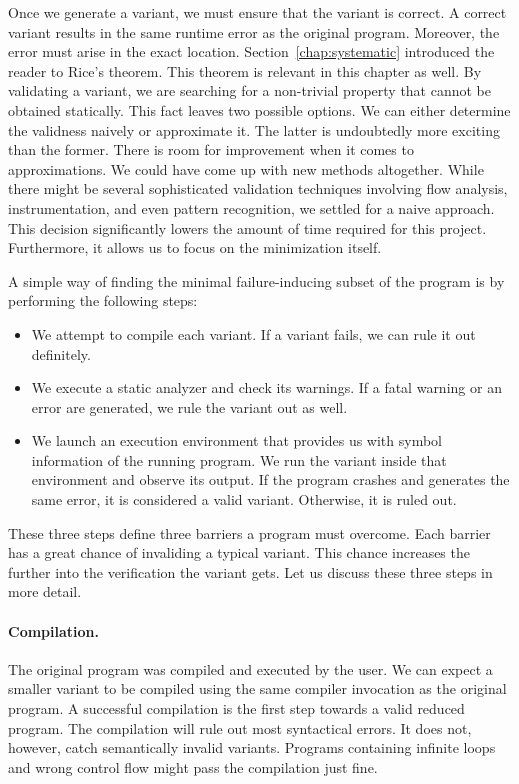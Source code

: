 Once we generate a variant, we must ensure that the variant is correct. 
A correct variant results in the same runtime error as the original program. 
Moreover, the error must arise in the exact location. 
Section~\ref{chap:systematic} introduced the reader to Rice's theorem. 
This theorem is relevant in this chapter as well. 
By validating a variant, we are searching for a non-trivial property that 
cannot be obtained statically. 
This fact leaves two possible options. 
We can either determine the validness naively or approximate it. 
The latter is undoubtedly more exciting than the former. 
There is room for improvement when it comes to approximations. 
We could have come up with new methods altogether. 
While there might be several sophisticated validation techniques involving 
flow analysis, instrumentation, and even pattern recognition, we settled for 
a naive approach. 
This decision significantly lowers the amount of time required for this 
project. 
Furthermore, it allows us to focus on the minimization itself.

A simple way of finding the minimal failure-inducing subset of the program is 
by performing the following steps:
\begin{itemize}
  \item We attempt to compile each variant. 
  If a variant fails, we can rule it out definitely.
  \item We execute a static analyzer and check its warnings. 
  If a fatal warning or an error are generated, we rule the variant out as 
  well.
  \item We launch an execution environment that provides us with symbol 
  information of the running program. 
  We run the variant inside that environment and observe its output. 
  If the program crashes and generates the same error, it is considered 
  a valid variant. 
  Otherwise, it is ruled out.
\end{itemize}
These three steps define three barriers a program must overcome. 
Each barrier has a great chance of invaliding a typical variant. 
This chance increases the further into the verification the variant gets. 
Let us discuss these three steps in more detail.

\paragraph{Compilation.} The original program was compiled and executed by 
the user. 
We can expect a smaller variant to be compiled using the same compiler 
invocation as the original program. 
A successful compilation is the first step towards a valid reduced program. 
The compilation will rule out most syntactical errors. 
It does not, however, catch semantically invalid variants. 
Programs containing infinite loops and wrong control flow might pass 
the compilation just fine.

